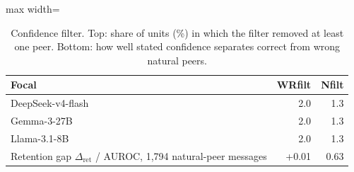 \begin{table}[t]
\centering
\caption{Confidence filter. Top: share of units (\%) in which the filter removed at least one peer. Bottom: how well stated confidence separates correct from wrong natural peers.}
\label{tab:filter}
\begin{adjustbox}{max width=\linewidth}
\small
\begin{tabular}{@{}lrr@{}}
\toprule
Focal & WRfilt & Nfilt \\
\midrule
DeepSeek-v4-flash & 2.0 & 1.3 \\
Gemma-3-27B & 2.0 & 1.3 \\
Llama-3.1-8B & 2.0 & 1.3 \\
\midrule
Retention gap $\Delta_{\mathrm{ret}}$ / AUROC, 1{,}794 natural-peer messages & +0.01 & 0.63 \\
\bottomrule
\end{tabular}
\end{adjustbox}
\end{table}

